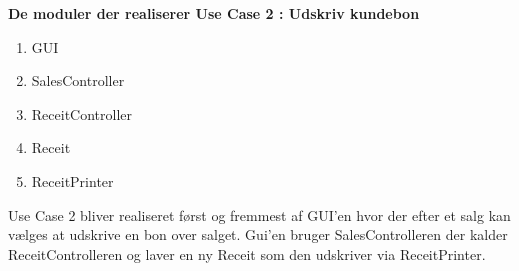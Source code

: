 \textbf{De moduler der realiserer Use Case 2 : Udskriv kundebon}

\begin{enumerate}
	\item GUI
	\item SalesController
	\item ReceitController
	\item Receit
	\item ReceitPrinter
\end{enumerate}

Use Case 2 bliver realiseret først og fremmest af GUI'en hvor der efter et salg kan vælges at udskrive en bon over salget. Gui'en bruger SalesControlleren der kalder ReceitControlleren og laver en ny Receit som den udskriver via ReceitPrinter. 